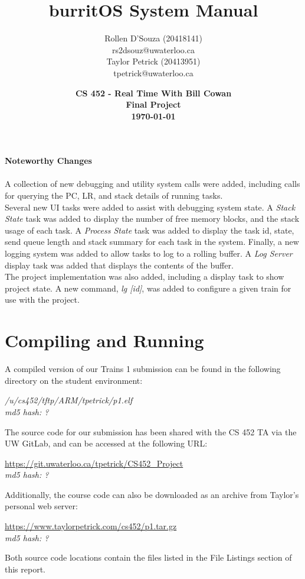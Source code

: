 \documentclass[twoside,a4paper]{refart}
\title{burritOS System Manual}
\author{Rollen D'Souza (20418141) \\
rs2dsouz@uwaterloo.ca \\
Taylor Petrick (20413951) \\
tpetrick@uwaterloo.ca \\}
\date{\textbf{CS 452 - Real Time With Bill Cowan \\ Final Project \\ \today}}
\begin{document}
\maketitle


\textbf{Noteworthy Changes}\\\\
A collection of new debugging and utility system calls were added, including calls for querying the PC, LR, and stack details of running tasks.\\

Several new UI tasks were added to assist with debugging system state. A \textit{Stack State} task was added to display the number of free memory blocks, and the stack usage of each task. A \textit{Process State} task was added to display the task id, state, send queue length and stack summary for each task in the system. Finally, a new logging system was added to allow tasks to log to a rolling buffer. A \textit{Log Server} display task was added that displays the contents of the buffer.\\

The project implementation was also added, including a display task to show project state. A new command, \textit{lg [id]}, was added to configure a given train for use with the project.

\newpage
\tableofcontents
\newpage


\section{Compiling and Running}
A compiled version of our Trains 1 submission can be found in the following directory on the student environment:
\begin{center}
\textit{/u/cs452/tftp/ARM/tpetrick/p1.elf}\\
\textit{md5 hash: ?}
\end{center}
The source code for our submission has been shared with the CS 452 TA via the UW GitLab, and can be accessed at the following URL:
\begin{center}
\url{https://git.uwaterloo.ca/tpetrick/CS452_Project}\\
\textit{md5 hash: ?}
\end{center}
Additionally, the course code can also be downloaded as an archive from Taylor’s personal web server:
\begin{center}
\url{https://www.taylorpetrick.com/cs452/p1.tar.gz}\\
\textit{md5 hash: ?}
\end{center}
Both source code locations contain the files listed in the File Listings section of this report.
\end{document}
